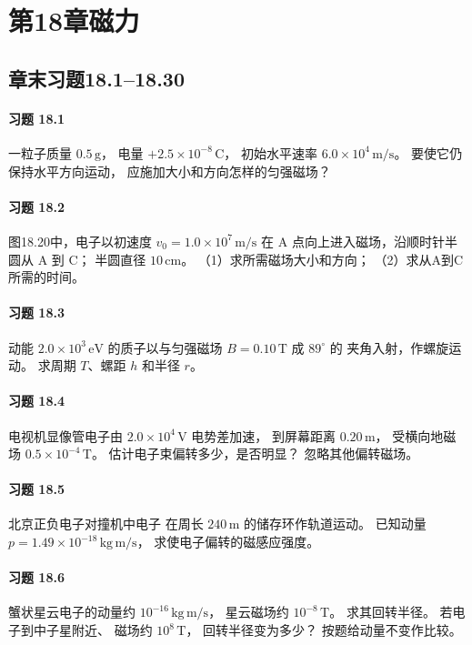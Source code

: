 \section*{第18章\quad 磁力}
\subsection*{章末习题18.1--18.30}

\paragraph{习题 18.1}
一粒子质量 \(0.5\,\mathrm g\)，
电量 \(+2.5\times10^{-8}\,\mathrm C\)，
初始水平速率 \(6.0\times10^4\,\mathrm{m/s}\)。
要使它仍保持水平方向运动，
应施加大小和方向怎样的匀强磁场？

\paragraph{习题 18.2}
图18.20中，电子以初速度
\(v_0=1.0\times10^7\,\mathrm{m/s}\)
在 A 点向上进入磁场，沿顺时针半圆从 A 到 C；
半圆直径 \(10\,\mathrm{cm}\)。
（1）求所需磁场大小和方向；
（2）求从A到C所需的时间。

\paragraph{习题 18.3}
动能 \(2.0\times10^3\,\mathrm{eV}\)
的质子以与匀强磁场
\(B=0.10\,\mathrm T\) 成 \(89^\circ\) 的
夹角入射，作螺旋运动。
求周期 \(T\)、螺距 \(h\) 和半径 \(r\)。

\paragraph{习题 18.4}
电视机显像管电子由
\(2.0\times10^4\,\mathrm V\) 电势差加速，
到屏幕距离 \(0.20\,\mathrm m\)，
受横向地磁场 \(0.5\times10^{-4}\,\mathrm T\)。
估计电子束偏转多少，是否明显？
忽略其他偏转磁场。

\paragraph{习题 18.5}
北京正负电子对撞机中电子
在周长 \(240\,\mathrm m\) 的储存环作轨道运动。
已知动量 \(p=1.49\times10^{-18}
\,\mathrm{kg\,m/s}\)，
求使电子偏转的磁感应强度。

\paragraph{习题 18.6}
蟹状星云电子的动量约
\(10^{-16}\,\mathrm{kg\,m/s}\)，
星云磁场约 \(10^{-8}\,\mathrm T\)。
求其回转半径。
若电子到中子星附近、
磁场约 \(10^8\,\mathrm T\)，
回转半径变为多少？
按题给动量不变作比较。

